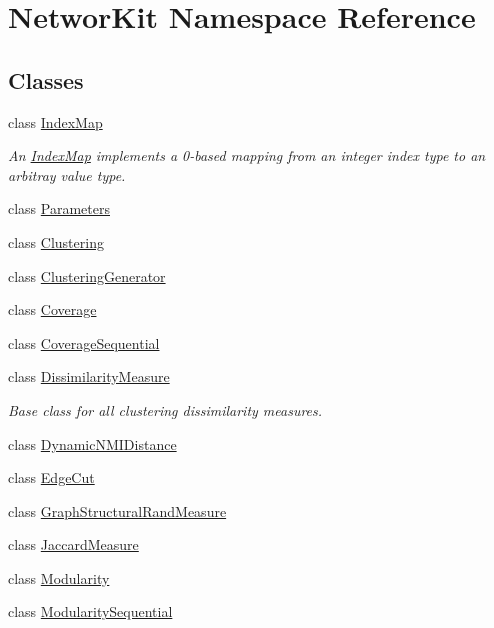 \hypertarget{namespace_networ_kit}{\section{Networ\-Kit Namespace Reference}
\label{namespace_networ_kit}
}
\subsection*{Classes}
\begin{DoxyCompactItemize}
\item 
class \hyperlink{class_networ_kit_1_1_index_map}{Index\-Map}
\begin{DoxyCompactList}\small\item\em An \hyperlink{class_networ_kit_1_1_index_map}{Index\-Map} implements a 0-\/based mapping from an integer index type to an arbitray value type. \end{DoxyCompactList}\item 
class \hyperlink{class_networ_kit_1_1_parameters}{Parameters}
\item 
class \hyperlink{class_networ_kit_1_1_clustering}{Clustering}
\item 
class \hyperlink{class_networ_kit_1_1_clustering_generator}{Clustering\-Generator}
\item 
class \hyperlink{class_networ_kit_1_1_coverage}{Coverage}
\item 
class \hyperlink{class_networ_kit_1_1_coverage_sequential}{Coverage\-Sequential}
\item 
class \hyperlink{class_networ_kit_1_1_dissimilarity_measure}{Dissimilarity\-Measure}
\begin{DoxyCompactList}\small\item\em Base class for all clustering dissimilarity measures. \end{DoxyCompactList}\item 
class \hyperlink{class_networ_kit_1_1_dynamic_n_m_i_distance}{Dynamic\-N\-M\-I\-Distance}
\item 
class \hyperlink{class_networ_kit_1_1_edge_cut}{Edge\-Cut}
\item 
class \hyperlink{class_networ_kit_1_1_graph_structural_rand_measure}{Graph\-Structural\-Rand\-Measure}
\item 
class \hyperlink{class_networ_kit_1_1_jaccard_measure}{Jaccard\-Measure}
\item 
class \hyperlink{class_networ_kit_1_1_modularity}{Modularity}
\item 
class \hyperlink{class_networ_kit_1_1_modularity_sequential}{Modularity\-Sequential}

\end{DoxyCompactItemize}
